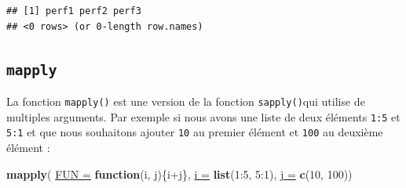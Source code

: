 \documentclass[twoside,symmetric]{book}
\newenvironment{Shaded}{}{}
\newcommand{\ControlFlowTok}[1]{\textbf{#1}}
\newcommand{\DataTypeTok}[1]{\underline{#1}}
\newcommand{\DecValTok}[1]{#1}
\newcommand{\KeywordTok}[1]{\textbf{#1}}
\newcommand{\NormalTok}[1]{#1}
\newcommand{\OperatorTok}[1]{#1}
\newcommand{\OtherTok}[1]{#1}
\newcommand{\StringTok}[1]{#1}
\begin{document}
\begin{Shaded}
\end{Shaded}

\begin{verbatim}
## [1] perf1 perf2 perf3
## <0 rows> (or 0-length row.names)
\end{verbatim}

\hypertarget{l17mapply}{%
\subsection{\texorpdfstring{\texttt{mapply}}{mapply}}\label{l17mapply}}

La fonction \texttt{mapply()} est une version de la fonction \texttt{sapply()}qui utilise de multiples arguments. Par exemple si nous avons une liste de deux éléments \texttt{1:5} et \texttt{5:1} et que nous souhaitons ajouter \texttt{10} au premier élément et \texttt{100} au deuxième élément :

\begin{Shaded}
\begin{Highlighting}[]
\KeywordTok{mapply}\NormalTok{(}
  \DataTypeTok{FUN =} \ControlFlowTok{function}\NormalTok{(i, j)\{i}\OperatorTok{+}\NormalTok{j\}, }
  \DataTypeTok{i =} \KeywordTok{list}\NormalTok{(}\DecValTok{1}\OperatorTok{:}\DecValTok{5}\NormalTok{, }\DecValTok{5}\OperatorTok{:}\DecValTok{1}\NormalTok{), }
  \DataTypeTok{j =} \KeywordTok{c}\NormalTok{(}\DecValTok{10}\NormalTok{, }\DecValTok{100}\NormalTok{))}
\end{Highlighting}
\end{Shaded}
\end{document}
